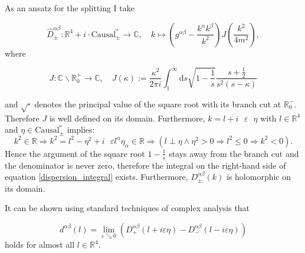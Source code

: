 \documentclass[b5paper,draft,openbib,12pt]{memoir}
\begin{document}
As an ansatz for the splitting I take

\begin{equation}
\hat{D}_{\pm}^{\alpha \beta}: \mathbb{R}^4 +i \cdot \text{Causal}^º_{\pm} \rightarrow \mathbb{C}, \quad k \mapsto (g^{\alpha \beta} -\frac{k^\alpha k^\beta }{k^2}) J\left( \frac{k^2}{4m^2}\right),
\end{equation}
where 

\begin{equation}\label{dispersion_integral}
J: \mathbb{C}\backslash \mathbb{R}^+_0 \rightarrow \mathbb{C}, \quad J(\kappa) := \frac{\kappa^2}{2\pi i} \int_1^\infty \mathrm{d}s \sqrt{1-\frac{1}{s}} \frac{s+\frac{1}{2}}{s^2 (s-\kappa)}
\end{equation}

and \(\sqrt{\cdot}\) denotes the principal value of the square root with its branch cut at \(\mathbb{R}^-_0\). Therefore \(J\) is well defined on its domain. Furthermore, \(k=l +i\text{ }\varepsilon \text{ } \eta\) with \(l\in\mathbb{R}^4\) and \(\eta \in \text{Causal}^º_{\pm}\) implies:
\begin{equation}
k^2\in \mathbb{R}\Rightarrow k^2=l^2-\eta^2 +i \text{ }\varepsilon l^\alpha \eta_\alpha \in \mathbb{R} \Rightarrow \left( l \perp \eta \wedge \eta^2>0 \Rightarrow l^2 \le 0  \Rightarrow k^2<0\right).
\end{equation}
Hence the argument of the square root \(1-\frac{1}{s}\) stays away from the branch cut and the denominator is never zero, therefore the integral on the right-hand side of equation \eqref{dispersion_integral} exists. Furthermore, \(D^{\alpha \beta}_{\pm} (k)\) is holomorphic on its domain.

It can be shown using standard techniques of complex analysis that

\begin{equation}\label{d_at_boundary}
d^{\alpha \beta} (l)=\lim_{\varepsilon \searrow 0} \left( D^{\alpha \beta}_+ (l+i\varepsilon\eta)-D^{\alpha \beta}_- (l-i\varepsilon\eta) \right)
\end{equation}
holds for almost all \(l\in\mathbb{R}^4\). 

 

\end{document}
